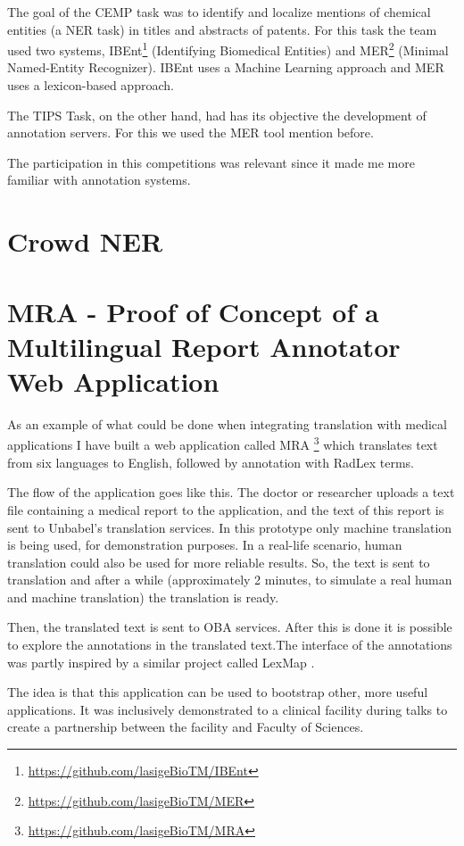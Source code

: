 The goal of the CEMP task was to identify and localize mentions of chemical entities (a NER task) in titles and abstracts of patents. For this task the team used two systems, IBEnt\footnote{\url{https://github.com/lasigeBioTM/IBEnt}} (Identifying Biomedical Entities) and MER\footnote{\url{https://github.com/lasigeBioTM/MER}} (Minimal Named-Entity Recognizer). IBEnt uses a Machine Learning approach and MER uses a lexicon-based approach. 

The TIPS Task, on the other hand, had has its objective the development of annotation servers. For this we used the MER tool mention before. 


The participation in this competitions was relevant since it made me more familiar with annotation systems.

\section{Crowd NER}

\section{MRA - Proof of Concept of a Multilingual Report Annotator Web Application}

As an example of what could be done when integrating translation with medical applications I have built a web application called MRA \citep{Campos2017}\footnote{\url{https://github.com/lasigeBioTM/MRA}} which translates text from six languages to English, followed by annotation with RadLex terms. 

The flow of the application goes like this. The doctor or researcher uploads a text file containing a medical report to the application, and the text of this report is sent to Unbabel's translation services. In this prototype only machine translation is being used, for demonstration purposes. In a real-life scenario, human translation could also be used for more reliable results. So, the text is sent to translation and after a while (approximately 2 minutes, to simulate a real human and machine translation) the translation is ready.

Then, the translated text is sent to OBA services. After
this is done it is possible to explore the annotations in the translated text.The interface of the annotations was partly inspired by a similar project called LexMap \citep{Hostetter2015}.

The idea is that this application can be used to bootstrap other, more useful applications. It was inclusively demonstrated to a clinical facility during talks to create a partnership between the facility and Faculty of Sciences.

 
